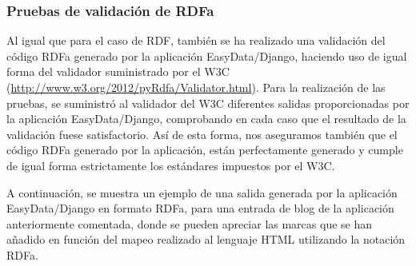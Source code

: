 \subsubsection{Pruebas de validación de RDFa}

Al igual que para el caso de RDF, también se ha realizado una validación del
código RDFa generado por la aplicación EasyData/Django, haciendo uso de igual
forma del validador suministrado por el W3C
(\url{http://www.w3.org/2012/pyRdfa/Validator.html}). Para la realización de las
pruebas, se suministró al validador del W3C diferentes salidas proporcionadas
por la aplicación EasyData/Django, comprobando en cada caso que el resultado de
la validación fuese satisfactorio. Así de esta forma, nos aseguramos también que
el código RDFa generado por la aplicación, están perfectamente generado y cumple
de igual forma estrictamente los estándares impuestos por el W3C.

A continuación, se muestra un ejemplo de una salida generada por la aplicación
EasyData/Django en formato RDFa, para una entrada de blog de la aplicación
anteriormente comentada, donde se pueden apreciar las marcas que se han añadido
en función del mapeo realizado al lenguaje HTML utilizando la notación RDFa.

